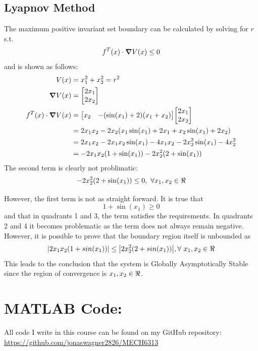 \documentclass[letter]{article}
\numberwithin{equation}{section}
\begin{document}
\subsection{Lyapnov Method}
The maximum positive invariant set boundary can be calculated by solving for $r$ s.t. $$f^T(x) \cdot \grad{V(x)} \leq 0$$ and is shown as follows:
\begin{align}
	V(x) &= x_1^2 + x_2^2 = r^2\\
	\grad{V(x)} &= \mqty[2 x_1\\ 2 x_2]\\
	f^T(x) \cdot \grad{V(x)}
	&= \mqty[x_2 &-(\sin(x_1) + 2)(x_1 + x_2)] \mqty[2 x_1\\ 2 x_2]\\
	&= 2 x_1 x_2 - 2 x_2(x_1 \sin(x_1) + 2 x_1 + x_2 \sin(x_1) + 2 x_2)\\
	&= 2 x_1 x_2 - 2 x_1 x_2 \sin(x_1) - 4 x_1 x_2 - 2 x_2^2 \sin(x_1) - 4 x_2^2\\
	&= -2 x_1 x_2 (1 + \sin(x_1)) - 2 x_2^2 (2 + \sin(x_1))
\end{align}
The second term is clearly not problimatic: $$- 2 x_2^2 (2 + \sin(x_1)) \leq 0, \ \forall x_1,x_2 \in \real$$

However, the first term is not as straight forward. It is true that $$1+\sin(x_1) \geq 0$$ and that in quadrants 1 and 3, the term satisfies the requirements. In quadrants 2 and 4 it becomes problematic as the term does not always remain negative. However, it is possible to prove that the boundary region itself is unbounded as $$\abs{2x_1 x_2(1+sin(x_1))} \leq \abs{2x_2^2 (2+sin(x_1))}, \forall \ x_1,x_2 \in \real$$
This leads to the conclusion that the system is Globally Asymptotically Stable since the region of convergence is $x_1,x_2 \in \real$.










\newpage
\appendix
\section{MATLAB Code:}\label{apx:matlab}
All code I write in this course can be found on my GitHub repository:\\
\href{https://github.com/jonaswagner2826/MECH6313}{https://github.com/jonaswagner2826/MECH6313}

\end{document}
